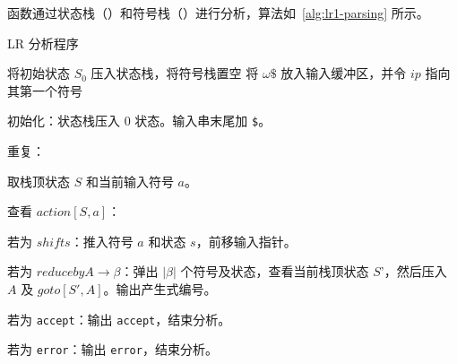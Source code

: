  函数通过状态栈（）和符号栈（）进行分析，算法如~\autoref{alg:lr1-parsing} 所示。
\begin{algorithm}[htbp]
    \caption{LR 分析程序}
    \label{alg:lr1-parsing}
    
    将初始状态 $S_0$ 压入状态栈，将符号栈置空\;
    将 $\omega\$ $ 放入输入缓冲区，并令 $ip$ 指向其第一个符号\;
    
\end{algorithm}
\begin{compactitem}
    \item 初始化：状态栈压入 0 状态。输入串末尾加 \verb|$|。
	\item 重复：\begin{compactitem}
        \item 取栈顶状态 $S$ 和当前输入符号 $a$。
        \item 查看 $action[S, a]$：\begin{compactitem}
            \item 若为 $shift s$：推入符号 $a$ 和状态 $s$，前移输入指针。
            \item 若为 $reduce by A \to \beta$：弹出 $|\beta|$ 个符号及状态，查看当前栈顶状态 $S’$，然后压入 $A$ 及 $goto[S', A]$。输出产生式编号。
            \item 若为 \texttt{accept}：输出 \texttt{accept}，结束分析。
            \item 若为 \texttt{error}：输出 \texttt{error}，结束分析。
        \end{compactitem}
    \end{compactitem}
\end{compactitem}

